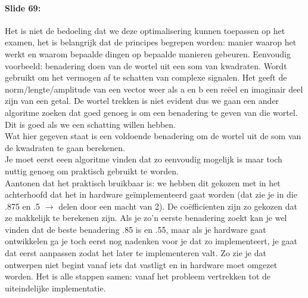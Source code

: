 \documentclass[10pt,a4paper]{book}
\begin{document}
\paragraph{Slide 69:} Het is niet de bedoeling dat we deze optimalisering kunnen toepassen op het examen, het is belangrijk dat de principes begrepen worden: manier waarop het werkt en waarom bepaalde dingen op bepaalde manieren gebeuren. Eenvoudig voorbeeld: benadering doen van de wortel uit een som van kwadraten. Wordt gebruikt om het vermogen af te schatten van complexe signalen. Het geeft de norm/lengte/amplitude van een vector weer als a en b een re\"eel en imaginair deel zijn van een getal. De wortel trekken is niet evident dus we gaan een ander algoritme zoeken dat goed genoeg is om een benadering te geven van die wortel. Dit is goed als we een schatting willen hebben.\\
Wat hier gegeven staat is een voldoende benadering om de wortel uit de som van de kwadraten te gaan berekenen.\\
Je moet eerst eeen algoritme vinden dat zo eenvoudig mogelijk is maar toch nuttig genoeg om praktisch gebruikt te worden.\\
Aantonen dat het praktisch bruikbaar is: we hebben dit gekozen met in het achterhoofd dat het in hardware ge\"implementeerd gaat worden (dat zie je in die .875 en .5 $\rightarrow$ delen door een macht van 2). De co\"efficienten zijn zo gekozen dat ze makkelijk te berekenen zijn. Als je zo'n eerste benadering zoekt kan je wel vinden dat de beste benadering .85 is en .55, maar als je hardware gaat ontwikkelen ga je toch eerst nog nadenken voor je dat zo implementeert, je gaat dat eerst aanpassen zodat het later te implementeren valt. Zo zie je dat ontwerpen niet begint vanaf iets dat vastligt en in hardware moet omgezet worden. Het is alle stappen samen: vanaf het probleem vertrekken tot de uiteindelijke implementatie.
\end{document}
